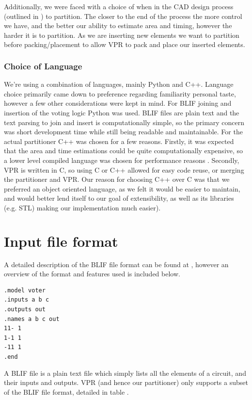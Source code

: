\documentclass[12pt,drafta4paper,oneside]{memoir} %
\begin{document}
{Additionally, we were faced with a choice of when in the \ac{CAD} design process (outlined in ) to partition. The closer to the end of the process the more control we have, and the better our ability to estimate area and timing, however the harder it is to partition. As we are inserting new elements we want to partition before packing/placement to allow \ac{VPR} to pack and place our inserted elements.

\subsubsection{Choice of Language}
We're using a combination of languages, mainly Python and C++. Language choice primarily came down to preference regarding familiarity personal taste, however a few other considerations were kept in mind.
For \ac{BLIF} joining and insertion of the voting logic Python was used. \ac{BLIF} files are plain text and the text parsing to join and insert is computationally simple, so the primary concern was short development time while still being readable and maintainable.
For the actual partitioner C++ was chosen for a few reasons. Firstly, it was expected that the area and time estimations could be quite computationally expensive, so a lower level compiled language was chosen for performance reasons . Secondly, \ac{VPR} is written in C, so using C or C++ allowed for easy code reuse, or merging the partitioner and \ac{VPR}. Our reason for choosing C++ over C was that we preferred an object oriented language, as we felt it would be easier to maintain, and would better lend itself to our goal of extensibility, as well as its libraries (e.g. \ac{STL}) making our implementation much easier).

\section{Input file format}
A detailed description of the \ac{BLIF} file format can be found at , however an overview of the format and features used is included below.
\begin{lstlisting}[caption=Sample BLIF file, label=SampleBlif]
.model voter
.inputs a b c
.outputs out
.names a b c out
11- 1
1-1 1
-11 1
.end
\end{lstlisting}
A \ac{BLIF} file is a plain text file which simply lists all the elements of a circuit, and their inputs and outputs. \ac{VPR} (and hence our partitioner) only supports a subset of the \ac{BLIF} file format, detailed in table .

}
\end{document}
